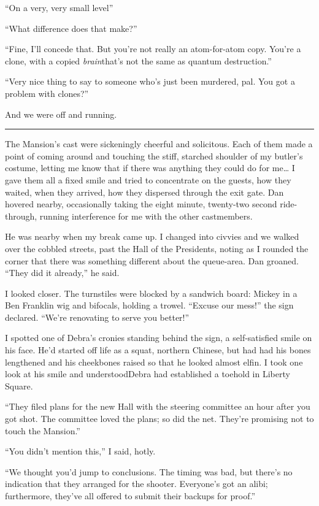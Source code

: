 “On a very, very small level{\dash}”

“What difference does that make?”

“Fine, I'll concede that. But you're not really an atom-for-atom
copy. You're a clone, with a copied \emph{brain}{\dash}that's not the
same as quantum destruction.”

“Very nice thing to say to someone who's just been murdered, pal.
You got a problem with clones?”

And we were off and running.

\begin{center}\rule{3in}{0.4pt}\end{center}

The Mansion's cast were sickeningly cheerful and solicitous. Each
of them made a point of coming around and touching the stiff,
starched shoulder of my butler's costume, letting me know that if
there was anything they could do for me… I gave them all a fixed
smile and tried to concentrate on the guests, how they waited, when
they arrived, how they dispersed through the exit gate. Dan hovered
nearby, occasionally taking the eight minute, twenty-two second
ride-through, running interference for me with the other
castmembers.

He was nearby when my break came up. I changed into civvies and we
walked over the cobbled streets, past the Hall of the Presidents,
noting as I rounded the corner that there was something different
about the queue-area. Dan groaned. “They did it already,” he said.

I looked closer. The turnstiles were blocked by a sandwich board:
Mickey in a Ben Franklin wig and bifocals, holding a trowel.
“Excuse our mess!” the sign declared. “We're renovating to serve
you better!”

I spotted one of Debra's cronies standing behind the sign, a
self-satisfied smile on his face. He'd started off life as a squat,
northern Chinese, but had had his bones lengthened and his
cheekbones raised so that he looked almost elfin. I took one look
at his smile and understood{\dash}Debra had established a toehold in
Liberty Square.

“They filed plans for the new Hall with the steering committee an
hour after you got shot. The committee loved the plans; so did the
net. They're promising not to touch the Mansion.”

“You didn't mention this,” I said, hotly.

“We thought you'd jump to conclusions. The timing was bad, but
there's no indication that they arranged for the shooter.
Everyone's got an alibi; furthermore, they've all offered to submit
their backups for proof.”

